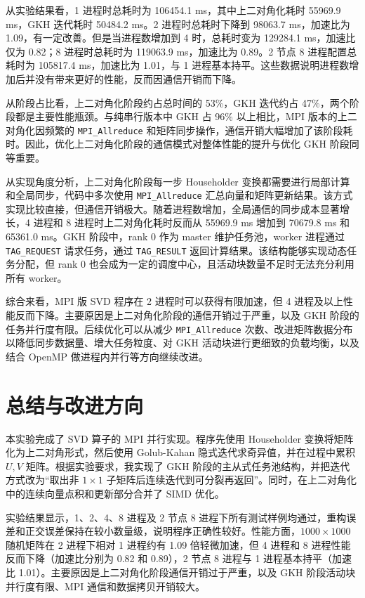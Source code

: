 \documentclass[UTF8,a4paper,12pt]{ctexart}
\begin{document}
从实验结果看，1 进程时总耗时为 106454.1 ms，其中上二对角化耗时 55969.9 ms，GKH 迭代耗时 50484.2 ms。2 进程时总耗时下降到 98063.7 ms，加速比为 1.09，有一定改善。但是当进程数增加到 4 时，总耗时变为 129284.1 ms，加速比仅为 0.82；8 进程时总耗时为 119063.9 ms，加速比为 0.89。2 节点 8 进程配置总耗时为 105817.4 ms，加速比为 1.01，与 1 进程基本持平。这些数据说明进程数增加后并没有带来更好的性能，反而因通信开销而下降。

从阶段占比看，上二对角化阶段约占总时间的 53\%，GKH 迭代约占 47\%，两个阶段都是主要性能瓶颈。与纯串行版本中 GKH 占 96\% 以上相比，MPI 版本的上二对角化因频繁的 \texttt{MPI\_Allreduce} 和矩阵同步操作，通信开销大幅增加了该阶段耗时。因此，优化上二对角化阶段的通信模式对整体性能的提升与优化 GKH 阶段同等重要。

从实现角度分析，上二对角化阶段每一步 Householder 变换都需要进行局部计算和全局同步，代码中多次使用 \texttt{MPI\_Allreduce} 汇总向量和矩阵更新结果。该方式实现比较直接，但通信开销极大。随着进程数增加，全局通信的同步成本显著增长，4 进程和 8 进程时上二对角化耗时反而从 55969.9 ms 增加到 70679.8 ms 和 65361.0 ms。GKH 阶段中，rank 0 作为 master 维护任务池，worker 进程通过 \texttt{TAG\_REQUEST} 请求任务，通过 \texttt{TAG\_RESULT} 返回计算结果。该结构能够实现动态任务分配，但 rank 0 也会成为一定的调度中心，且活动块数量不足时无法充分利用所有 worker。

综合来看，MPI 版 SVD 程序在 2 进程时可以获得有限加速，但 4 进程及以上性能反而下降。主要原因是上二对角化阶段的通信开销过于严重，以及 GKH 阶段的任务并行度有限。后续优化可以从减少 \texttt{MPI\_Allreduce} 次数、改进矩阵数据分布以降低同步数据量、增大任务粒度、对 GKH 活动块进行更细致的负载均衡，以及结合 OpenMP 做进程内并行等方向继续改进。

\section{总结与改进方向}

本实验完成了 SVD 算子的 MPI 并行实现。程序先使用 Householder 变换将矩阵化为上二对角形式，然后使用 Golub-Kahan 隐式迭代求奇异值，并在过程中累积 $U,V$ 矩阵。根据实验要求，我实现了 GKH 阶段的主从式任务池结构，并把迭代方式改为“取出非 $1\times1$ 子矩阵后连续迭代到可分裂再返回”。同时，在上二对角化中的连续向量点积和更新部分合并了 SIMD 优化。

实验结果显示，1、2、4、8 进程及 2 节点 8 进程下所有测试样例均通过，重构误差和正交误差保持在较小数量级，说明程序正确性较好。性能方面，$1000\times1000$ 随机矩阵在 2 进程下相对 1 进程约有 1.09 倍轻微加速，但 4 进程和 8 进程性能反而下降（加速比分别为 0.82 和 0.89），2 节点 8 进程与 1 进程基本持平（加速比 1.01）。主要原因是上二对角化阶段通信开销过于严重，以及 GKH 阶段活动块并行度有限、MPI 通信和数据拷贝开销较大。
\end{document}
